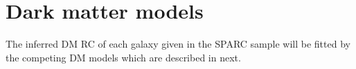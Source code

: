\section{Dark matter models}
\label{sec:dark-matter-models}

The inferred DM RC of each galaxy given in the SPARC sample will be fitted by the competing DM models which are described in next. 





